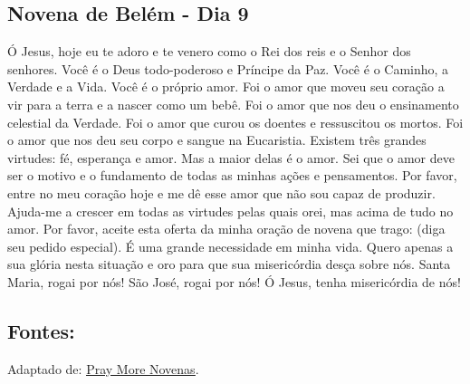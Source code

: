 \documentclass[a4paper,14pt,twoside]{extarticle} \usepackage[utf8]{inputenc}
\begin{document}
\subsection{Novena de Belém - Dia 9}

Ó Jesus, hoje eu te adoro e te venero como o Rei dos reis e o Senhor dos senhores. Você é o Deus todo-poderoso e Príncipe da Paz. Você é o Caminho, a Verdade e a Vida. Você é o próprio amor. Foi o amor que moveu seu coração a vir para a terra e a nascer como um bebê. Foi o amor que nos deu o ensinamento celestial da Verdade. Foi o amor que curou os doentes e ressuscitou os mortos. Foi o amor que nos deu seu corpo e sangue na Eucaristia. Existem três grandes virtudes: fé, esperança e amor. Mas a maior delas é o amor. Sei que o amor deve ser o motivo e o fundamento de todas as minhas ações e pensamentos. Por favor, entre no meu coração hoje e me dê esse amor que não sou capaz de produzir. Ajuda-me a crescer em todas as virtudes pelas quais orei, mas acima de tudo no amor. Por favor, aceite esta oferta da minha oração de novena que trago: (diga seu pedido especial). É uma grande necessidade em minha vida. Quero apenas a sua glória nesta situação e oro para que sua misericórdia desça sobre nós. Santa Maria, rogai por nós! São José, rogai por nós! Ó Jesus, tenha misericórdia de nós!


\vfill

\begin{center}
\subsection*{Fontes:}
Adaptado de: 
 \underline{\href{https://www.praymorenovenas.com/bethlehem-novena}{Pray More Novenas}}.
\end{center}
\end{document}
